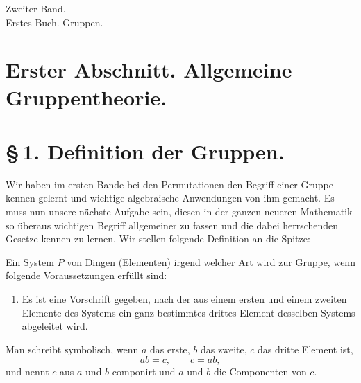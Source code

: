 \documentclass[11pt]{article}
\begin{document}
\begin{center}{\large Zweiter Band.}\\[0.4em]{\Large Erstes Buch. Gruppen.}\\[0.4em]\end{center}

\section*{Erster Abschnitt. Allgemeine Gruppentheorie.}

\section*{\S\,1. Definition der Gruppen.}

Wir haben im ersten Bande bei den Permutationen den Begriff einer Gruppe kennen gelernt und wichtige algebraische Anwendungen von ihm gemacht. Es muss nun unsere nächste Aufgabe sein, diesen in der ganzen neueren Mathematik so überaus wichtigen Begriff allgemeiner zu fassen und die dabei herrschenden Gesetze kennen zu lernen. Wir stellen folgende Definition an die Spitze:

Ein System $P$ von Dingen (Elementen) irgend welcher Art wird zur Gruppe, wenn folgende Voraussetzungen erfüllt sind:

\begin{enumerate}[label=\arabic*.]
\item Es ist eine Vorschrift gegeben, nach der aus einem ersten und einem zweiten Elemente des Systems ein ganz bestimmtes drittes Element desselben Systems abgeleitet wird.
\end{enumerate}
Man schreibt symbolisch, wenn $a$ das erste, $b$ das zweite, $c$ das dritte Element ist,
\[
ab=c,\qquad c=ab,
\]
und nennt $c$ aus $a$ und $b$ componirt und $a$ und $b$ die Componenten von $c$.
\end{document}
